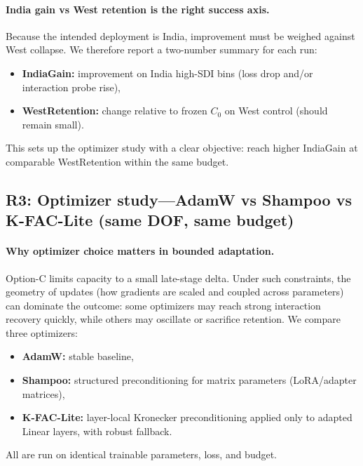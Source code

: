 \paragraph{India gain vs West retention is the right success axis.}
Because the intended deployment is India, improvement must be weighed against West collapse. We therefore report a two-number summary for each run:
\begin{itemize}[leftmargin=*,itemsep=2pt]
\item \textbf{IndiaGain:} improvement on India high-SDI bins (loss drop and/or interaction probe rise),
\item \textbf{WestRetention:} change relative to frozen $C_0$ on West control (should remain small).
\end{itemize}
This sets up the optimizer study with a clear objective: reach higher IndiaGain at comparable WestRetention within the same budget.

\subsection{R3: Optimizer study---AdamW vs Shampoo vs K-FAC-Lite (same DOF, same budget)}
\label{sec:r3_optimizer_study}

\paragraph{Why optimizer choice matters in bounded adaptation.}
Option-C limits capacity to a small late-stage delta. Under such constraints, the geometry of updates (how gradients are scaled and coupled across parameters) can dominate the outcome: some optimizers may reach strong interaction recovery quickly, while others may oscillate or sacrifice retention. We compare three optimizers:
\begin{itemize}[leftmargin=*,itemsep=2pt]
\item \textbf{AdamW:} stable baseline,
\item \textbf{Shampoo:} structured preconditioning for matrix parameters (LoRA/adapter matrices),
\item \textbf{K-FAC-Lite:} layer-local Kronecker preconditioning applied only to adapted Linear layers, with robust fallback.
\end{itemize}
All are run on identical trainable parameters, loss, and budget.

\vspace{4pt}
